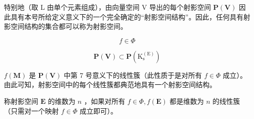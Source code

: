 特别地（取 L 由单个元素组成），由向量空间 V 导出的每个射影空间 \(\mathbf{P}(\mathbf{V})\) 因此具有本号所给定义意义下的一个完全确定的“射影空间结构”。因此，任何具有射影空间结构的集合都可以称为射影空间。

\[
f \in \Phi
\]

\[
\mathbf {P} (\mathbf {V}) \subset \mathbf {P} \left(\mathrm{K} _ {\mathrm{s}} ^ {(\mathrm{E})}\right)
\]

\(f(\mathbf{M})\) 是 \(\mathbf{P}(\mathbf{V})\) 中第 7 号意义下的线性簇（此性质于是对所有 \(f \in \Phi\) 成立）。由此可知，射影空间中的每个线性簇都典范地具有一个射影空间结构。

称射影空间 \(\mathbf{E}\) 的维数为 \(n\) ，如果对所有 \(f\in\Phi,f(\mathbf{E})\) 都是维数为 \(n\) 的线性簇（只需对一个映射 \(f\in\Phi\) 成立即可）。

